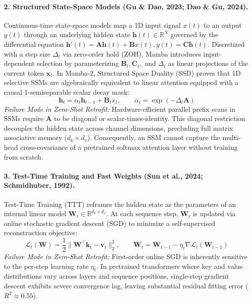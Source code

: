 \documentclass[11pt,a4paper]{article}
\begin{document}
\paragraph{2. Structured State-Space Models (Gu \& Dao, 2023; Dao \& Gu, 2024).}
Continuous-time state-space models map a 1D input signal $x(t)$ to an output $y(t)$ through an underlying hidden state $\mathbf{h}(t) \in \mathbb{R}^N$ governed by the differential equation $\mathbf{h}'(t) = \mathbf{A}\mathbf{h}(t) + \mathbf{B}x(t), y(t) = \mathbf{C}\mathbf{h}(t)$. Discretized with a step size $\Delta_t$ via zero-order hold (ZOH), Mamba introduces input-dependent selection by parameterizing $\mathbf{B}_t, \mathbf{C}_t,$ and $\Delta_t$ as linear projections of the current token $\mathbf{x}_t$. In Mamba-2, Structured Space Duality (SSD) proves that 1D selective SSMs are algebraically equivalent to linear attention equipped with a causal 1-semiseparable scalar decay mask:
\begin{equation}
\mathbf{h}_t = \alpha_t \mathbf{h}_{t-1} + \mathbf{B}_t x_t, \qquad \alpha_t = \exp(-\Delta_t \mathbf{A})
\end{equation}
\textit{Failure Mode in Zero-Shot Retrofit:} Hardware-efficient parallel prefix scans in SSMs require $\mathbf{A}$ to be diagonal or scalar-times-identity. This diagonal restriction decouples the hidden state across channel dimensions, precluding full matrix associative memory ($d_k \times d_v$). Consequently, an SSM cannot capture the multi-head cross-covariance of a pretrained softmax attention layer without training from scratch.

\paragraph{3. Test-Time Training and Fast Weights (Sun et al., 2024; Schmidhuber, 1992).}
Test-Time Training (TTT) reframes the hidden state as the parameters of an internal linear model $\mathbf{W}_t \in \mathbb{R}^{d_k \times d_v}$. At each sequence step, $\mathbf{W}_t$ is updated via online stochastic gradient descent (SGD) to minimize a self-supervised reconstruction objective:
\begin{equation}
\mathcal{L}_t(\mathbf{W}) = \frac{1}{2} \|\mathbf{W}^\top \mathbf{k}_t - \mathbf{v}_t\|_2^2, \qquad \mathbf{W}_t = \mathbf{W}_{t-1} - \eta_t \nabla \mathcal{L}_t(\mathbf{W}_{t-1})
\end{equation}
\textit{Failure Mode in Zero-Shot Retrofit:} First-order online SGD is inherently sensitive to the per-step learning rate $\eta_t$. In pretrained transformers where key and value distributions vary across layers and sequence positions, single-step gradient descent exhibits severe convergence lag, leaving substantial residual fitting error ($R^2 \approx 0.55$).
\end{document}
